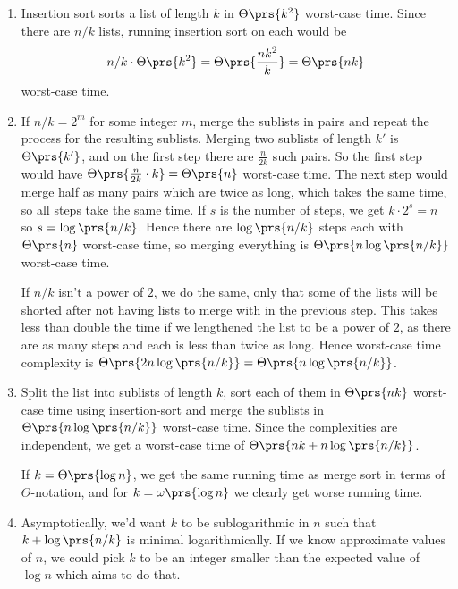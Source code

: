 \documentclass[oneside]{scrbook}
\theoremstyle{definition}
\begin{document}
\begin{problem}
    \begin{enumerate}[label = \alph*.]
    \item
    Insertion sort sorts a list of length $k$ in $\Theta\prs{k^2}$ worst-case time. Since there are $n/k$ lists, running insertion sort on each would be \[n/k \cdot \Theta\prs{k^2} = \Theta\prs{\frac{nk^2}{k}} = \Theta\prs{nk}\] worst-case time.
    
    \item
    If $n/k = 2^m$ for some integer $m$, merge the sublists in pairs and repeat the process for the resulting sublists. Merging two sublists of length $k'$ is $\Theta\prs{k'}$, and on the first step there are $\frac{n}{2k}$ such pairs. So the first step would have $\Theta\prs{\frac{n}{2k} \cdot k} = \Theta\prs{n}$ worst-case time. The next step would merge half as many pairs which are twice as long, which takes the same time, so all steps take the same time. If $s$ is the number of steps, we get $k \cdot 2^s = n$ so $s = \log\prs{n/k}$. Hence there are $\log\prs{n/k}$ steps each with $\Theta\prs{n}$ worst-case time, so merging everything is $\Theta\prs{n \log\prs{n/k}}$ worst-case time.
    
    If $n/k$ isn't a power of $2$, we do the same, only that some of the lists will be shorted after not having lists to merge with in the previous step. This takes less than double the time if we lengthened the list to be a power of $2$, as there are as many steps and each is less than twice as long. Hence worst-case time complexity is $\Theta\prs{2 n \log\prs{n/k}} = \Theta\prs{n \log\prs{n/k}}$. 
    
    \item
    Split the list into sublists of length $k$, sort each of them in $\Theta\prs{nk}$ worst-case time using insertion-sort and merge the sublists in $\Theta\prs{n \log \prs{n/k}}$ worst-case time. Since the complexities are independent, we get a worst-case time of $\Theta\prs{nk + n \log\prs{n/k}}$.
    
    If $k = \Theta\prs{\log n}$, we get the same running time as merge sort in terms of $\Theta$-notation, and for $k = \omega\prs{\log n}$ we clearly get worse running time.
    
    \item
    Asymptotically, we'd want $k$ to be sublogarithmic in $n$ such that $k + \log\prs{n/k}$ is minimal logarithmically. If we know approximate values of $n$, we could pick $k$ to be an integer smaller than the expected value of $\log n$ which aims to do that. 
    \end{enumerate}
\end{problem}
\end{document}
